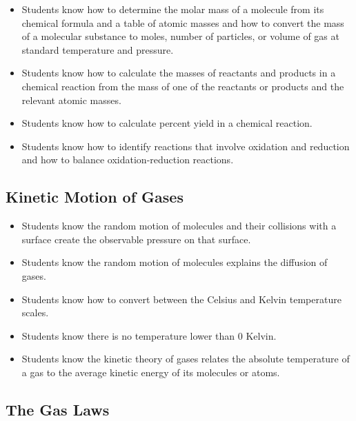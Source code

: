 \documentclass[12pt]{article}
\begin{document}
\begin{itemize}
    \item Students know how to determine the molar mass of a molecule from its chemical formula and a table of atomic masses and how to convert the mass of a molecular substance to moles, number of particles, or volume of gas at standard temperature and pressure.
    \item Students know how to calculate the masses of reactants and products in a chemical reaction from the mass of one of the reactants or products and the relevant atomic masses.
    \item Students know how to calculate percent yield in a chemical reaction.
    \item Students know how to identify reactions that involve oxidation and reduction and how to balance oxidation-reduction reactions.
\end{itemize}

\subsection{Kinetic Motion of Gases}

\begin{itemize}
    \item Students know the random motion of molecules and their collisions with a surface create the observable pressure on that surface.
    \item Students know the random motion of molecules explains the diffusion of gases.
    \item Students know how to convert between the Celsius and Kelvin temperature scales.
    \item Students know there is no temperature lower than 0 Kelvin.
    \item Students know the kinetic theory of gases relates the absolute temperature of a gas to the average kinetic energy of its molecules or atoms.
\end{itemize}

\subsection{The Gas Laws}
\end{document}
